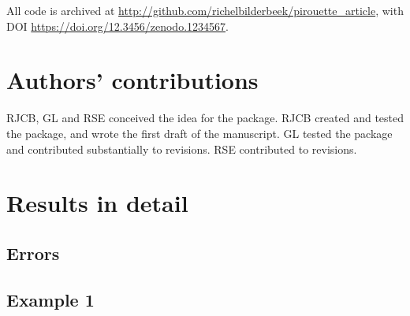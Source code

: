 \documentclass{article}
\begin{document}
All code is archived at 
\url{http://github.com/richelbilderbeek/pirouette_article},
with DOI \url{https://doi.org/12.3456/zenodo.1234567}.

\section{Authors' contributions}

RJCB, GL and RSE conceived the idea for the package. 
RJCB created and tested the package, and wrote the first draft of the 
manuscript.
GL tested the package and contributed substantially to revisions.
RSE contributed to revisions.




\appendix

\section{Results in detail}

\subsection{Errors}

\subsection{Example 1}
\end{document}
